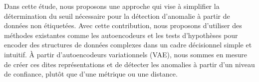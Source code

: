 Dans cette étude, nous proposons une approche qui vise à simplifier la détermination du seuil nécessaire pour la détection d'anomalie à partir de données non étiquetées. Avec cette contribution, nous proposons d'utiliser des méthodes existantes comme les autoencodeurs et les tests d'hypothèses pour encoder des structures de données complexes dans un cadre décisionnel simple et intuitif. À partir d'autoencodeurs variationnels (VAE), nous sommes en mesure de créer ces dites représentations et de détecter les anomalies à partir d'un niveau de confiance, plutôt que d'une métrique ou une distance.